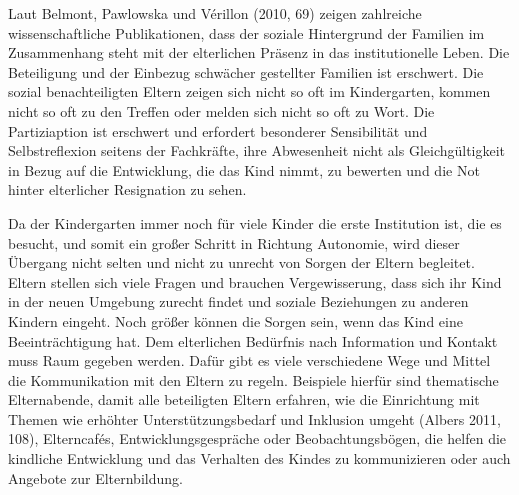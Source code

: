 Laut Belmont, Pawlowska  und Vérillon (2010, 69) zeigen zahlreiche wissenschaftliche Publikationen, dass der soziale Hintergrund der Familien im Zusammenhang steht mit der elterlichen Präsenz in das institutionelle Leben. Die Beteiligung und der Einbezug schwächer gestellter Familien ist erschwert. Die sozial benachteiligten Eltern zeigen sich nicht so oft im Kindergarten, kommen nicht so oft zu den Treffen oder melden sich nicht so oft zu Wort. Die Partiziaption ist erschwert und erfordert besonderer Sensibilität und Selbstreflexion seitens der Fachkräfte, ihre Abwesenheit nicht als Gleichgültigkeit in Bezug auf die Entwicklung, die das Kind nimmt, zu bewerten und die Not hinter elterlicher Resignation zu sehen.

Da der Kindergarten immer noch für viele Kinder die erste Institution ist, die es besucht, und somit ein großer Schritt in Richtung Autonomie, wird dieser Übergang nicht selten und nicht zu unrecht von Sorgen der Eltern begleitet. Eltern stellen sich viele Fragen und brauchen Vergewisserung, dass sich ihr Kind in der neuen Umgebung zurecht findet und soziale Beziehungen zu anderen Kindern eingeht. Noch größer können die Sorgen sein, wenn das Kind eine Beeinträchtigung hat. Dem elterlichen Bedürfnis nach Information und Kontakt muss Raum gegeben werden. Dafür gibt es viele verschiedene Wege und Mittel die Kommunikation mit den Eltern zu regeln. Beispiele hierfür sind thematische Elternabende, damit alle beteiligten Eltern erfahren, wie die Einrichtung mit Themen wie erhöhter Unterstützungsbedarf und Inklusion umgeht (Albers 2011, 108), Elterncafés, Entwicklungsgespräche oder Beobachtungsbögen, die helfen die kindliche Entwicklung und das Verhalten des Kindes zu kommunizieren oder auch Angebote zur Elternbildung.  
  
